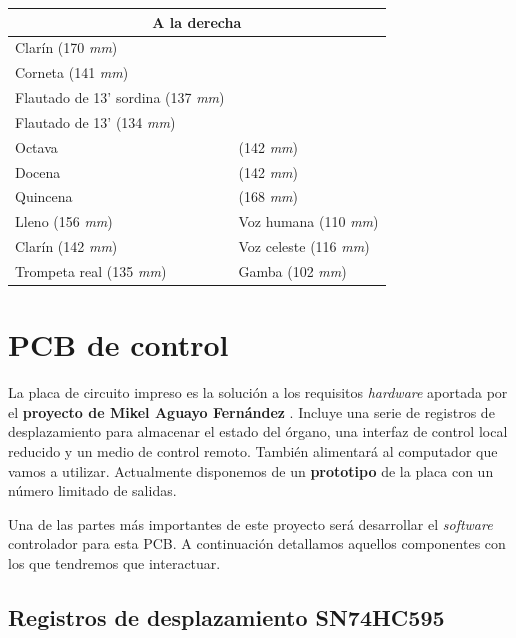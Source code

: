 \begin{center}
	\begin{tabular}{|l|l|}
		\hline \multicolumn{2}{|c|}{\textbf{A la derecha}} \\
		\hline Clarín (170 \textit{mm}) &  \\ 
		\hline Corneta (141 \textit{mm}) &  \\ 
		\hline Flautado de 13' sordina (137 \textit{mm}) &  \\ 
		\hline Flautado de 13' (134 \textit{mm}) &  \\ 
		\hline Octava & (142 \textit{mm}) \\ 
		\hline Docena & (142 \textit{mm}) \\ 
		\hline Quincena & (168 \textit{mm}) \\ 
		\hline Lleno (156 \textit{mm}) & Voz humana (110 \textit{mm}) \\ 
		\hline Clarín (142 \textit{mm}) & Voz celeste (116 \textit{mm}) \\ 
		\hline Trompeta real (135 \textit{mm}) & Gamba (102 \textit{mm}) \\ 
		\hline 
	\end{tabular}
	\smallskip
\end{center}

\smallskip

\newpage

\section{PCB de control}

La placa de circuito impreso es la solución a los requisitos \textit{hardware} aportada por el \textbf{proyecto de Mikel Aguayo Fernández} \cite{mikel}. Incluye una serie de registros de desplazamiento para almacenar el estado del órgano, una interfaz de control local reducido y un medio de control remoto. También alimentará al computador que vamos a utilizar. Actualmente disponemos de un \textbf{prototipo} de la placa con un número limitado de salidas.

Una de las partes más importantes de este proyecto será desarrollar el \textit{software} controlador para esta \acrshort{PCB}. A continuación detallamos aquellos componentes con los que tendremos que interactuar.

\subsection{Registros de desplazamiento SN74HC595}

